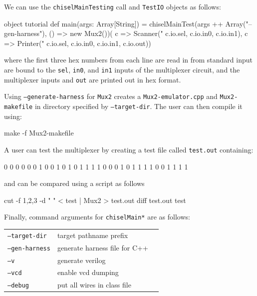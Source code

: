 \documentclass[10pt,twocolumn]{article}
\def\code#1{{\small\tt #1}}
\begin{document}
\noindent

We can use the \code{chiselMainTesting} call and \code{TestIO} objects as follows:

\begin{scala}
object tutorial {
  def main(args: Array[String]) = {
    chiselMainTest(args ++ Array("--gen-harness"), 
                   () => new Mux2())(
      c => Scanner("%
                   c.io.sel, c.io.in0, c.io.in1),
      c => Printer("%
                   c.io.sel, c.io.in0, c.io.in1, 
                   c.io.out))
  }
}
\end{scala}

\noindent
where the first three hex numbers from each line are read in from
standard input are bound to the \code{sel}, \code{in0},  and
\code{in1} inputs of the multiplexer circuit, and the multiplexer
inputs and \code{out} are printed out in hex format.  

Using \code{--generate-harness} for \code{Mux2}
creates a \code{Mux2-emulator.cpp}  and \code{Mux2-makefile} in directory
specified by \code{--target-dir}.  The user can then compile it using:

\begin{scala}
make -f Mux2-makefile
\end{scala}

\noindent

A user can test the multiplexer by creating a test file called
\code{test.out} containing:
\begin{scala}
0 0 0 0
0 0 1 0
0 1 0 1
0 1 1 1
1 0 0 0
1 0 1 1
1 1 0 0
1 1 1 1
\end{scala}

\noindent
and can be compared using a script as follows

\begin{scala}
cut -f 1,2,3 -d " " < test | Mux2 > test.out
diff test.out test
\end{scala}
 
Finally, command arguments for \code{chiselMain*} are as follows: \\

\begin{tabular}{lll}
\code{--target-dir} & target pathname prefix \\
\code{--gen-harness} & generate harness file for C++ \\
\code{--v} & generate verilog \\
\code{--vcd} & enable vcd dumping \\
\code{--debug} & put all wires in class file \\
\end{tabular}
\end{document}
